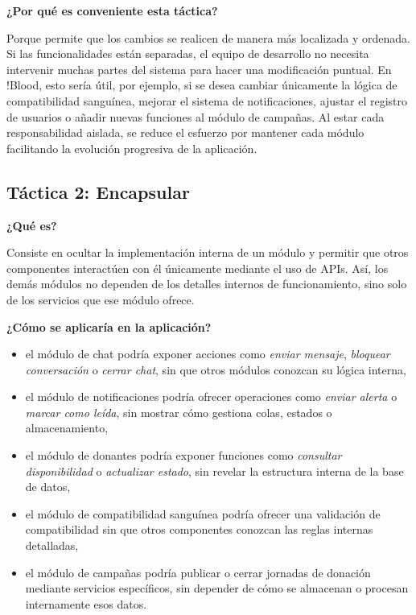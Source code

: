\medskip
\noindent\textbf{¿Por qué es conveniente esta táctica?}

Porque permite que los cambios se realicen de manera más localizada y ordenada. Si las funcionalidades están separadas, el equipo de desarrollo no necesita intervenir muchas partes del sistema para hacer una modificación puntual. En !Blood, esto sería útil, por ejemplo, si se desea cambiar únicamente la lógica de compatibilidad sanguínea, mejorar el sistema de notificaciones, ajustar el registro de usuarios o añadir nuevas funciones al módulo de campañas. Al estar cada responsabilidad aislada, se reduce el esfuerzo por mantener cada módulo facilitando la evolución progresiva de la aplicación.

\subsection{Táctica 2: Encapsular}

\noindent\textbf{¿Qué es?}

Consiste en ocultar la implementación interna de un módulo y permitir que otros componentes interactúen con él únicamente mediante el uso de APIs. Así, los demás módulos no dependen de los detalles internos de funcionamiento, sino solo de los servicios que ese módulo ofrece.

\medskip
\noindent\textbf{¿Cómo se aplicaría en la aplicación?}

\begin{itemize}
    \item el módulo de chat podría exponer acciones como \textit{enviar mensaje}, \textit{bloquear conversación} o \textit{cerrar chat}, sin que otros módulos conozcan su lógica interna,
    \item el módulo de notificaciones podría ofrecer operaciones como \textit{enviar alerta} o \textit{marcar como leída}, sin mostrar cómo gestiona colas, estados o almacenamiento,
    \item el módulo de donantes podría exponer funciones como \textit{consultar disponibilidad} o \textit{actualizar estado}, sin revelar la estructura interna de la base de datos,
    \item el módulo de compatibilidad sanguínea podría ofrecer una validación de compatibilidad sin que otros componentes conozcan las reglas internas detalladas,
    \item el módulo de campañas podría publicar o cerrar jornadas de donación mediante servicios específicos, sin depender de cómo se almacenan o procesan internamente esos datos.
\end{itemize}

